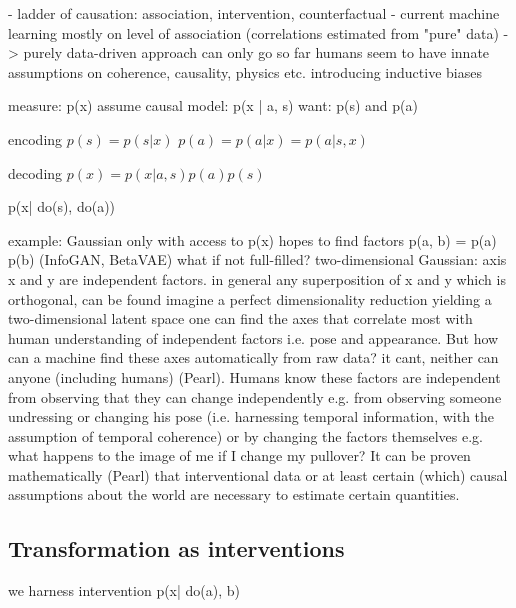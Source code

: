 	- ladder of causation: association, intervention, counterfactual
	- current machine learning mostly on level of association (correlations estimated from "pure" data)
	-> purely data-driven approach can only go so far
	humans seem to have innate assumptions on coherence, causality, physics etc. introducing inductive biases


	measure: p(x)
	assume causal model: p(x | a, s)
	want: p(s) and p(a)

	encoding
	$p(s) = p(s | x )$
	$p(a) = p(a | x) = p(a | s, x)$

	decoding
	$p(x) = p(x | a, s) p(a) p(s)$

	p(x| do(s), do(a))

	example: Gaussian
	only with access to p(x)
	hopes to find factors p(a, b) = p(a) p(b) (InfoGAN, BetaVAE)
	what if not full-filled?
	two-dimensional Gaussian: axis x and y are independent factors.
	in general any superposition of x and y which is orthogonal, can be found
	imagine a perfect dimensionality reduction yielding a  two-dimensional latent space one can find the axes that correlate most with human understanding of independent factors i.e. pose and appearance.
	But how can a machine find these axes automatically from raw data? it cant, neither can anyone (including humans) (Pearl). Humans know these factors are independent from observing that they can change independently e.g. from observing someone undressing or changing his pose (i.e. harnessing temporal information, with the assumption of temporal coherence) or by changing the factors themselves e.g. what happens to the image of me if I change my pullover?
	It can be proven mathematically (Pearl) that interventional data or at least certain (which) causal assumptions about the world are necessary to estimate certain quantities.

	\subsection{Transformation as interventions}


	we harness intervention
	p(x| do(a), b)



